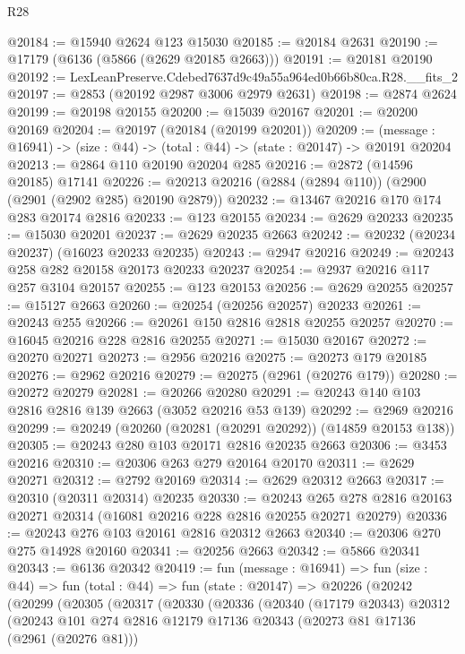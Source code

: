 \begin{lexlean}{R28}
\begin{coremodule}
@20184 := @15940 @2624 @123 @15030
@20185 := @20184 @2631
@20190 := @17179 (@6136 (@5866 (@2629 @20185 @2663)))
@20191 := @20181 @20190
@20192 := LexLeanPreserve.Cdebed7637d9c49a55a964ed0b66b80ca.R28.__fits_2
@20197 := @2853 (@20192 @2987 @3006 @2979 @2631)
@20198 := @2874 @2624
@20199 := @20198 @20155
@20200 := @15039 @20167
@20201 := @20200 @20169
@20204 := @20197 (@20184 (@20199 @20201))
@20209 := (message : @16941) -> (size : @44) -> (total : @44) -> (state : @20147) -> @20191 @20204
@20213 := @2864 @110 @20190 @20204 @285
@20216 := @2872 (@14596 @20185) @17141
@20226 := @20213 @20216 (@2884 (@2894 @110)) (@2900 (@2901 (@2902 @285) @20190 @2879))
@20232 := @13467 @20216 @170 @174 @283 @20174 @2816
@20233 := @123 @20155
@20234 := @2629 @20233
@20235 := @15030 @20201
@20237 := @2629 @20235 @2663
@20242 := @20232 (@20234 @20237) (@16023 @20233 @20235)
@20243 := @2947 @20216
@20249 := @20243 @258 @282 @20158 @20173 @20233 @20237
@20254 := @2937 @20216 @117 @257 @3104 @20157
@20255 := @123 @20153
@20256 := @2629 @20255
@20257 := @15127 @2663
@20260 := @20254 (@20256 @20257) @20233
@20261 := @20243 @255
@20266 := @20261 @150 @2816 @2818 @20255 @20257
@20270 := @16045 @20216 @228 @2816 @20255
@20271 := @15030 @20167
@20272 := @20270 @20271
@20273 := @2956 @20216
@20275 := @20273 @179 @20185
@20276 := @2962 @20216
@20279 := @20275 (@2961 (@20276 @179))
@20280 := @20272 @20279
@20281 := @20266 @20280
@20291 := @20243 @140 @103 @2816 @2816 @139 @2663 (@3052 @20216 @53 @139)
@20292 := @2969 @20216
@20299 := @20249 (@20260 (@20281 (@20291 @20292)) (@14859 @20153 @138))
@20305 := @20243 @280 @103 @20171 @2816 @20235 @2663
@20306 := @3453 @20216
@20310 := @20306 @263 @279 @20164 @20170
@20311 := @2629 @20271
@20312 := @2792 @20169
@20314 := @2629 @20312 @2663
@20317 := @20310 (@20311 @20314) @20235
@20330 := @20243
    @265
    @278
    @2816
    @20163
    @20271
    @20314
    (@16081 @20216 @228 @2816 @20255 @20271 @20279)
@20336 := @20243 @276 @103 @20161 @2816 @20312 @2663
@20340 := @20306 @270 @275 @14928 @20160
@20341 := @20256 @2663
@20342 := @5866 @20341
@20343 := @6136 @20342
@20419 := fun (message : @16941) =>
  fun (size : @44) =>
  fun (total : @44) =>
  fun (state : @20147) =>
  @20226
    (@20242
      (@20299
        (@20305
          (@20317
            (@20330
              (@20336
                (@20340
                  (@17179 @20343)
                  @20312
                  (@20243
                    @101
                    @274
                    @2816
                    @12179
                    @17136
                    @20343
                    (@20273 @81 @17136 (@2961 (@20276 @81)))

\end{coremodule}
\end{lexlean}
